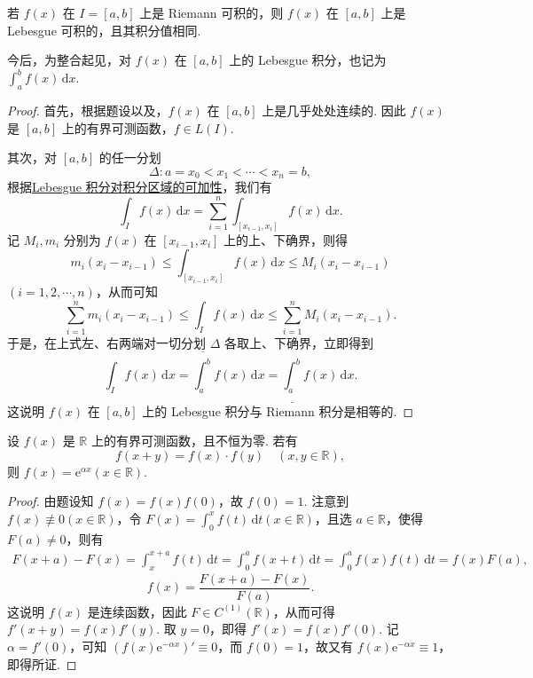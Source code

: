 \documentclass[../../main.tex]{subfiles}%
\begin{document}
\begin{theorem}\label{theorem:定理4.25}
若 \( f(x) \) 在 \( I = [a,b] \) 上是 Riemann 可积的，则 \( f(x) \) 在 \( [a,b] \) 上是 Lebesgue 可积的，且其积分值相同.
\end{theorem}
\begin{remark}
今后，为整合起见，对 \( f(x) \) 在 \( [a,b] \) 上的 Lebesgue 积分，也记为$\int_a^b f(x) \, \mathrm{d}x.$
\end{remark}
\begin{proof}
首先，根据题设以及，\( f(x) \) 在 \( [a,b] \) 上是几乎处处连续的. 因此 \( f(x) \) 是 \( [a,b] \) 上的有界可测函数，\( f \in L(I) \).

其次，对 \( [a,b] \) 的任一分划
\[
\Delta: a = x_0 < x_1 < \cdots < x_n = b,
\]
根据\hyperref[theorem:积分对定义域的可数可加性]{Lebesgue 积分对积分区域的可加性}，我们有
\[
\int_I f(x) \, \mathrm{d}x = \sum_{i=1}^n \int_{[x_{i-1}, x_i]} f(x) \, \mathrm{d}x.
\]
记 \( M_i, m_i \) 分别为 \( f(x) \) 在 \( [x_{i-1}, x_i] \) 上的上、下确界，则得
\[
m_i (x_i - x_{i-1}) \leqslant  \int_{[x_{i-1}, x_i]} f(x) \, \mathrm{d}x \leqslant  M_i (x_i - x_{i-1})
\]
\( (i = 1,2,\cdots,n) \)，从而可知
\[
\sum_{i=1}^n m_i (x_i - x_{i-1}) \leqslant  \int_I f(x) \, \mathrm{d}x \leqslant  \sum_{i=1}^n M_i (x_i - x_{i-1}).
\]
于是，在上式左、右两端对一切分划 \( \Delta \) 各取上、下确界，立即得到
\[
\int_I f(x) \, \mathrm{d}x = \overline{\int_a^b} f(x) \, \mathrm{d}x = \underline{\int_a^b} f(x) \, \mathrm{d}x.
\]
这说明 \( f(x) \) 在 \( [a,b] \) 上的 Lebesgue 积分与 Riemann 积分是相等的.
\end{proof}

\begin{proposition}
设 \( f(x) \) 是 \( \mathbb{R} \) 上的有界可测函数，且不恒为零. 若有
\[
f(x + y) = f(x) \cdot f(y) \quad (x, y \in \mathbb{R}),
\]
则 \( f(x) = \mathrm{e}^{\alpha x} (x \in \mathbb{R}) \).
\end{proposition}
\begin{proof}
由题设知 \( f(x) = f(x)f(0) \)，故 \( f(0) = 1 \). 注意到 \( f(x) \not\equiv 0 (x \in \mathbb{R}) \)，令 \( F(x) = \int_0^x f(t) \, \mathrm{d}t (x \in \mathbb{R}) \)，且选 \( a \in \mathbb{R} \)，使得 \( F(a) \neq 0 \)，则有
\begin{align*}
F(x + a) - F(x) = \int_x^{x + a} f(t) \, \mathrm{d}t = \int_0^a f(x + t) \, \mathrm{d}t 
= \int_0^a f(x)f(t) \, \mathrm{d}t = f(x)F(a),
\end{align*}
\[
f(x) = \frac{F(x + a) - F(x)}{F(a)}.
\]
这说明 \( f(x) \) 是连续函数，因此 \( F \in C^{(1)}(\mathbb{R}) \)，从而可得 \( f'(x + y) = f(x)f'(y) \). 取 \( y = 0 \)，即得 \( f'(x) = f(x)f'(0) \). 记 \( \alpha = f'(0) \)，可知 \( (f(x)\mathrm{e}^{-\alpha x})' \equiv 0 \)，而 \( f(0) = 1 \)，故又有 \( f(x)\mathrm{e}^{-\alpha x} \equiv 1 \)，即得所证.
\end{proof}
\end{document}

